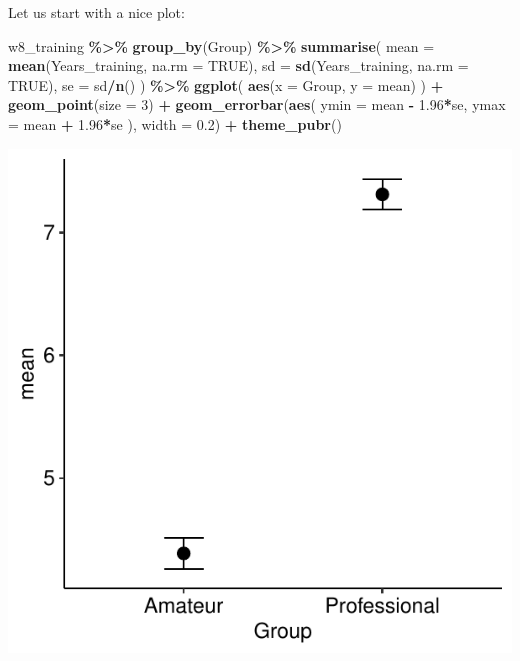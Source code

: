 \documentclass[
]{book}
\newenvironment{Shaded}{\begin{snugshade}}{\end{snugshade}}
\newcommand{\AttributeTok}[1]{\textcolor[rgb]{0.13,0.29,0.53}{#1}}
\newcommand{\ConstantTok}[1]{\textcolor[rgb]{0.56,0.35,0.01}{#1}}
\newcommand{\DecValTok}[1]{\textcolor[rgb]{0.00,0.00,0.81}{#1}}
\newcommand{\FloatTok}[1]{\textcolor[rgb]{0.00,0.00,0.81}{#1}}
\newcommand{\FunctionTok}[1]{\textcolor[rgb]{0.13,0.29,0.53}{\textbf{#1}}}
\newcommand{\NormalTok}[1]{#1}
\newcommand{\SpecialCharTok}[1]{\textcolor[rgb]{0.81,0.36,0.00}{\textbf{#1}}}
\begin{document}
Let us start with a nice plot:

\begin{Shaded}
\begin{Highlighting}[]
\NormalTok{w8\_training }\SpecialCharTok{\%\textgreater{}\%}
  \FunctionTok{group\_by}\NormalTok{(Group) }\SpecialCharTok{\%\textgreater{}\%}
  \FunctionTok{summarise}\NormalTok{(}
    \AttributeTok{mean =} \FunctionTok{mean}\NormalTok{(Years\_training, }\AttributeTok{na.rm =} \ConstantTok{TRUE}\NormalTok{),}
    \AttributeTok{sd =} \FunctionTok{sd}\NormalTok{(Years\_training, }\AttributeTok{na.rm =} \ConstantTok{TRUE}\NormalTok{),}
    \AttributeTok{se =}\NormalTok{ sd}\SpecialCharTok{/}\FunctionTok{n}\NormalTok{()}
\NormalTok{  ) }\SpecialCharTok{\%\textgreater{}\%}
  \FunctionTok{ggplot}\NormalTok{(}
    \FunctionTok{aes}\NormalTok{(}\AttributeTok{x =}\NormalTok{ Group, }\AttributeTok{y =}\NormalTok{ mean)}
\NormalTok{  ) }\SpecialCharTok{+}
  \FunctionTok{geom\_point}\NormalTok{(}\AttributeTok{size =} \DecValTok{3}\NormalTok{) }\SpecialCharTok{+}
  \FunctionTok{geom\_errorbar}\NormalTok{(}\FunctionTok{aes}\NormalTok{(}
    \AttributeTok{ymin =}\NormalTok{ mean }\SpecialCharTok{{-}} \FloatTok{1.96}\SpecialCharTok{*}\NormalTok{se,}
    \AttributeTok{ymax =}\NormalTok{ mean }\SpecialCharTok{+} \FloatTok{1.96}\SpecialCharTok{*}\NormalTok{se}
\NormalTok{  ), }\AttributeTok{width =} \FloatTok{0.2}\NormalTok{) }\SpecialCharTok{+}
  \FunctionTok{theme\_pubr}\NormalTok{()}
\end{Highlighting}
\end{Shaded}

\begin{center}\includegraphics{_main_files/figure-latex/unnamed-chunk-126-1} \end{center}
\end{document}

